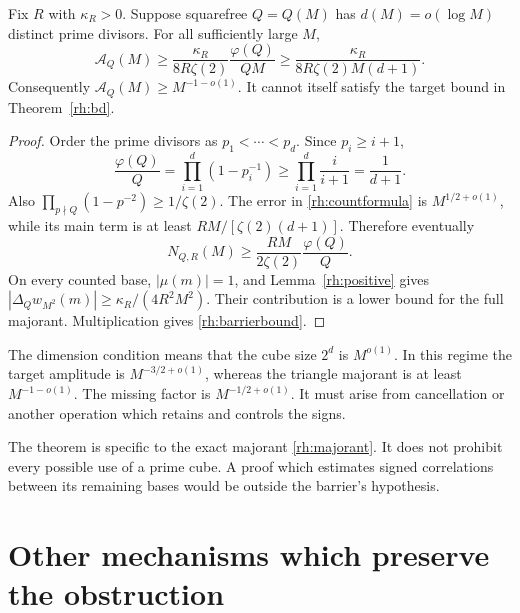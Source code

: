 \begin{theorem}\label{rh:barrier}
Fix \(R\) with \(\kappa_R>0\). Suppose squarefree \(Q=Q(M)\) has \(d(M)=o(\log M)\) distinct prime divisors. For all sufficiently large \(M\),
\begin{equation}\label{rh:barrierbound}
\mathcal A_Q(M)\ge
\frac{\kappa_R}{8R\zeta(2)}
\frac{\varphi(Q)}{QM}
\ge\frac{\kappa_R}{8R\zeta(2)M(d+1)}.
\end{equation}
Consequently \(\mathcal A_Q(M)\ge M^{-1-o(1)}\). It cannot itself satisfy the target bound in Theorem~\ref{rh:bd}.
\end{theorem}

\begin{proof}
Order the prime divisors as \(p_1<\cdots<p_d\). Since \(p_i\ge i+1\),
\[
\frac{\varphi(Q)}Q=\prod_{i=1}^d(1-p_i^{-1})
\ge\prod_{i=1}^d\frac i{i+1}=\frac1{d+1}.
\]
Also \(\prod_{p\nmid Q}(1-p^{-2})\ge1/\zeta(2)\).
The error in \eqref{rh:countformula} is \(M^{1/2+o(1)}\), while its main term is at least \(RM/[\zeta(2)(d+1)]\). Therefore eventually
\[
N_{Q,R}(M)\ge\frac{RM}{2\zeta(2)}\frac{\varphi(Q)}Q.
\]
On every counted base, \(|\mu(m)|=1\), and Lemma~\ref{rh:positive} gives
\(|\Delta_Qw_{M^2}(m)|\ge\kappa_R/(4R^2M^2)\).
Their contribution is a lower bound for the full majorant. Multiplication gives \eqref{rh:barrierbound}.
\end{proof}

The dimension condition means that the cube size \(2^d\) is \(M^{o(1)}\). In this regime the target amplitude is \(M^{-3/2+o(1)}\), whereas the triangle majorant is at least \(M^{-1-o(1)}\). The missing factor is \(M^{-1/2+o(1)}\). It must arise from cancellation or another operation which retains and controls the signs.

The theorem is specific to the exact majorant \eqref{rh:majorant}. It does not prohibit every possible use of a prime cube. A proof which estimates signed correlations between its remaining bases would be outside the barrier's hypothesis.


\section{Other mechanisms which preserve the obstruction}

